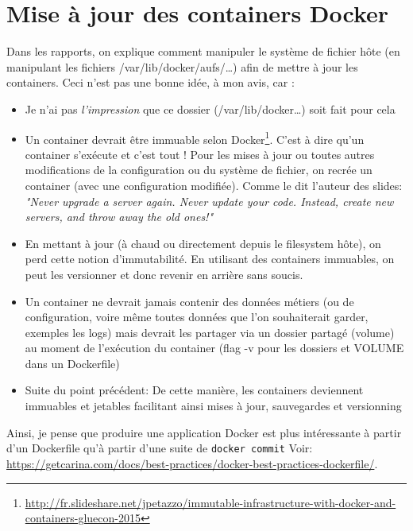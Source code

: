 \documentclass[11pt,a4paper,oneside]{report}
\newcommand{\code}[1]{\texttt{#1}}
\begin{document}
\section{Mise à jour des containers Docker}
Dans les rapports, on explique comment manipuler le système de fichier hôte (en manipulant les fichiers /var/lib/docker/aufs/\ldots{}) afin de mettre à jour les containers. Ceci n'est pas une bonne idée, à mon avis, car :
  
	\begin{itemize}
	\item Je n'ai pas \emph{l'impression} que ce dossier (/var/lib/docker\ldots{}) soit fait pour cela
	  
	\item Un container devrait être immuable selon Docker\footnote{\url{http://fr.slideshare.net/jpetazzo/immutable-infrastructure-with-docker-and-containers-gluecon-2015}}. C'est à dire qu'un container s'exécute et c'est tout ! Pour les mises à jour ou toutes autres modifications de la configuration ou du système de fichier, on recrée un container (avec une configuration modifiée). Comme le dit l'auteur des slides: \textit{"Never upgrade a server again. Never update your code. Instead, create new servers, and throw away the old ones!"}
	
	\item En mettant à jour (à chaud ou directement depuis le filesystem hôte), on perd cette notion d'immutabilité. En utilisant des containers immuables, on peut les versionner et donc revenir en arrière sans soucis.
	
	\item Un container ne devrait jamais contenir des données métiers (ou de configuration, voire même toutes données que l'on  souhaiterait garder, exemples les logs) mais devrait les partager via un dossier partagé (volume) au moment de l'exécution du container (flag -v pour les dossiers et VOLUME dans un Dockerfile)
	  
	\item Suite du point précédent: De cette manière, les containers deviennent immuables et jetables facilitant ainsi mises à jour, sauvegardes et versionning
	\end{itemize}

Ainsi, je pense que produire une application Docker est plus intéressante à partir d'un Dockerfile qu'à partir d'une suite de \code{docker commit} Voir: \url{https://getcarina.com/docs/best-practices/docker-best-practices-dockerfile/}.
\end{document}

